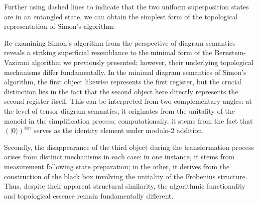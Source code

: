 \documentclass[a4paper,twocolumn,11pt,unpublished]{quantumarticle}
\numberwithin{equation}{section}
\begin{document}
Further using dashed lines to indicate that the two uniform superposition states are in an entangled state, we can obtain the simplest form of the topological representation of Simon's algorithm:
\begin{center}
\end{center}
Re-examining Simon's algorithm from the perspective of diagram semantics reveals a striking superficial resemblance to the minimal form of the Bernstein-Vazirani algorithm we previously presented; however, their underlying topological mechanisms differ fundamentally. In the minimal diagram semantics of Simon's algorithm, the first object likewise represents the first register, but the crucial distinction lies in the fact that the second object here directly represents the second register itself. This can be interpreted from two complementary angles: at the level of tensor diagram semantics, it originates from the unitality of the monoid in the simplification process; computationally, it stems from the fact that $(\vert 0 \rangle)^{\otimes n}$ serves as the identity element under modulo-2 addition.

Secondly, the disappearance of the third object during the transformation process arises from distinct mechanisms in each case: in one instance, it stems from measurement following state preparation; in the other, it derives from the construction of the black box involving the unitality of the Frobenius structure. Thus, despite their apparent structural similarity, the algorithmic functionality and topological essence remain fundamentally different.
\end{document}
